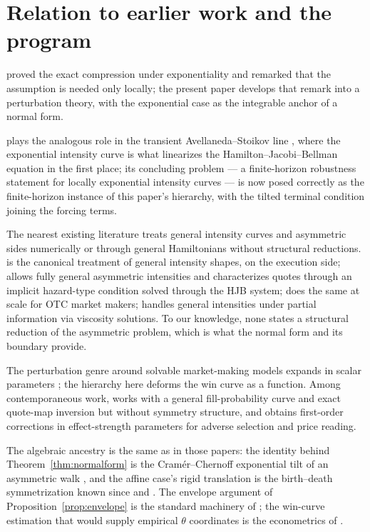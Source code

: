 \documentclass[11pt]{article}
\begin{document}
\section{Relation to earlier work and the program}\label{sec:relation}

\citet{cotton2026skew} proved the exact compression under exponentiality and remarked that the assumption is needed only locally; the present paper develops that remark into a perturbation theory, with the exponential case as the integrable anchor of a normal form.

\citet{cotton2026finite} plays the analogous role in the transient Avellaneda--Stoikov line \citep{avellaneda2008,glft2012}, where the exponential intensity curve is what linearizes the Hamilton--Jacobi--Bellman equation in the first place; its concluding problem --- a finite-horizon robustness statement for locally exponential intensity curves --- is now posed correctly as the finite-horizon instance of this paper's hierarchy, with the tilted terminal condition joining the forcing terms.

The nearest existing literature treats general intensity curves and asymmetric sides numerically or through general Hamiltonians without structural reductions. \citet{gueantlehalle2015} is the canonical treatment of general intensity shapes, on the execution side; \citet{gueant2017} allows fully general asymmetric intensities and characterizes quotes through an implicit hazard-type condition solved through the HJB system; \citet{bergaultgueant2021} does the same at scale for OTC market makers; \citet{campizabal2020} handles general intensities under partial information via viscosity solutions. To our knowledge, none states a structural reduction of the asymmetric problem, which is what the normal form and its boundary provide.

The perturbation genre around solvable market-making models expands in scalar parameters \citep{bergaultevgv2021}; the hierarchy here deforms the win curve as a function. Among contemporaneous work, \citet{barzykinciceri2026} works with a general fill-probability curve and exact quote-map inversion but without symmetry structure, and \citet{bbgl2025} obtains first-order corrections in effect-strength parameters for adverse selection and price reading.

The algebraic ancestry is the same as in those papers: the identity behind Theorem~\ref{thm:normalform} is the Cram\'er--Chernoff exponential tilt of an asymmetric walk \citep{chernoff1952,feller1968}, and the affine case's rigid translation is the birth--death symmetrization known since \citet{ledermannreuter1954} and \citet{karlinmcgregor1957}. The envelope argument of Proposition~\ref{prop:envelope} is the standard machinery of \citet{milgromsegal2002}; the win-curve estimation that would supply empirical $\theta$ coordinates is the econometrics of \citet{fgp2017}.
\end{document}
